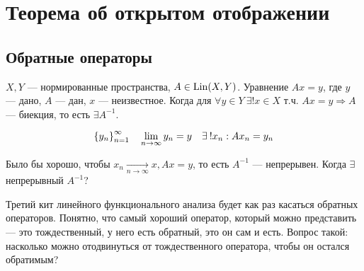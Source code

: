 \documentclass[document]{subfiles}
\begin{document}
\chapter{Теорема об открытом отображении}
\section{Обратные операторы}

$X,Y$ --- нормированные пространства, $A \in \operatorname{Lin}(X,Y)$. Уравнение $Ax = y$, где $y$ --- дано, $A$ --- дан, $x$ --- неизвестное.
Когда для $\forall y \in Y \: \exists! x \in X$ т.ч. $Ax = y \Rightarrow A$ --- биекция, то есть $\exists A^{-1}$. 

\[ \seq{y_n}^\infty_{n=1} \quad \liml_{n \to \infty} y_n = y \quad \exists! x_n : Ax_n = y_n \] 

Было бы хорошо, чтобы $x_n \underset{n \to \infty}{\longrightarrow} x, Ax = y$, то есть $A^{-1}$ --- непрерывен. Когда $\exists$ непрерывный $A^{-1}$?



Третий кит линейного функционального анализа будет как раз касаться обратных операторов. Понятно, что самый хороший оператор, который можно представить --- это тождественный, у него есть обратный, это он сам и есть.
 Вопрос такой: насколько можно отодвинуться от тождественного оператора, чтобы он остался обратимым?
\end{document}
